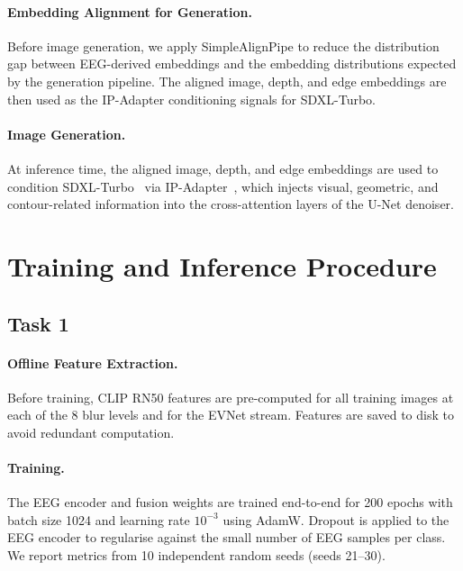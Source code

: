 \documentclass[11pt]{article}
\begin{document}
\paragraph{Embedding Alignment for Generation.}
Before image generation, we apply SimpleAlignPipe to reduce the distribution gap between EEG-derived embeddings and the embedding distributions expected by the generation pipeline.
The aligned image, depth, and edge embeddings are then used as the IP-Adapter conditioning signals for SDXL-Turbo.

\paragraph{Image Generation.}
At inference time, the aligned image, depth, and edge embeddings are used to condition SDXL-Turbo~\citep{sauer2023sdxlturbo,podell2023sdxl} via IP-Adapter~\citep{ye2023ipadapter}, which injects visual, geometric, and contour-related information into the cross-attention layers of the U-Net denoiser.

\section{Training and Inference Procedure}

\subsection{Task 1}

\paragraph{Offline Feature Extraction.}
Before training, CLIP RN50 features are pre-computed for all training images at each of the 8 blur levels and for the EVNet stream.
Features are saved to disk to avoid redundant computation.

\paragraph{Training.}
The EEG encoder and fusion weights are trained end-to-end for 200 epochs with batch size 1024 and learning rate $10^{-3}$ using AdamW.
Dropout is applied to the EEG encoder to regularise against the small number of EEG samples per class.
We report metrics from 10 independent random seeds (seeds 21--30).
\end{document}
